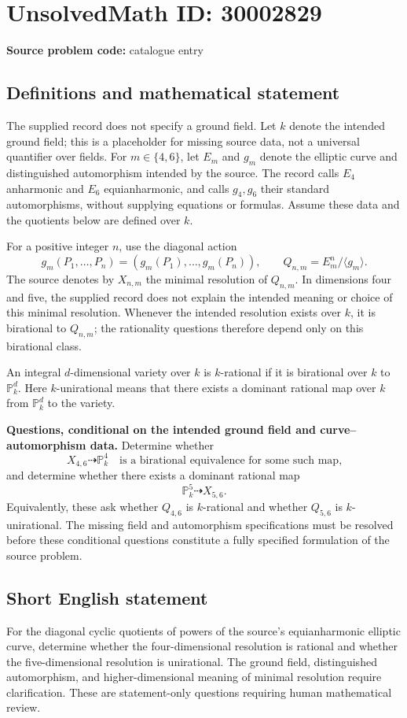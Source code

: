 \documentclass[11pt]{article}
\begin{document}
\section*{UnsolvedMath ID: 30002829}
\textbf{Source problem code:} catalogue entry
\subsection{Definitions and mathematical statement}
The supplied record does not specify a ground field. Let \(k\) denote the intended ground field; this is a placeholder for missing source data, not a universal quantifier over fields. For \(m\in\{4,6\}\), let \(E_m\) and \(g_m\) denote the elliptic curve and distinguished automorphism intended by the source. The record calls \(E_4\) anharmonic and \(E_6\) equianharmonic, and calls \(g_4,g_6\) their standard automorphisms, without supplying equations or formulas. Assume these data and the quotients below are defined over \(k\).

For a positive integer \(n\), use the diagonal action
\[
 g_m(P_1,\ldots,P_n)=(g_m(P_1),\ldots,g_m(P_n)),
 \qquad Q_{n,m}=E_m^n/\langle g_m\rangle.
\]
The source denotes by \(X_{n,m}\) the minimal resolution of \(Q_{n,m}\). In dimensions four and five, the supplied record does not explain the intended meaning or choice of this minimal resolution. Whenever the intended resolution exists over \(k\), it is birational to \(Q_{n,m}\); the rationality questions therefore depend only on this birational class.

An integral \(d\)-dimensional variety over \(k\) is \(k\)-rational if it is birational over \(k\) to \(\mathbb P_k^d\). Here \(k\)-unirational means that there exists a dominant rational map over \(k\) from \(\mathbb P_k^d\) to the variety.

\textbf{Questions, conditional on the intended ground field and curve--automorphism data.} Determine whether
\[
 X_{4,6}\dashrightarrow\mathbb P_k^4
 \quad\text{is a birational equivalence for some such map,}
\]
and determine whether there exists a dominant rational map
\[
 \mathbb P_k^5\dashrightarrow X_{5,6}.
\]
Equivalently, these ask whether \(Q_{4,6}\) is \(k\)-rational and whether \(Q_{5,6}\) is \(k\)-unirational. The missing field and automorphism specifications must be resolved before these conditional questions constitute a fully specified formulation of the source problem.
\subsection{Short English statement}
For the diagonal cyclic quotients of powers of the source's equianharmonic elliptic curve, determine whether the four-dimensional resolution is rational and whether the five-dimensional resolution is unirational. The ground field, distinguished automorphism, and higher-dimensional meaning of minimal resolution require clarification. These are statement-only questions requiring human mathematical review.
\end{document}
